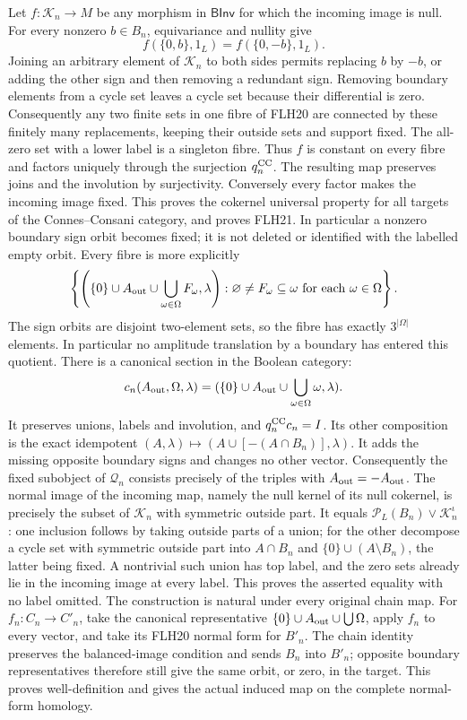 Let \(f:\mathcal K_n\to M\) be any morphism in
\(\mathsf{BInv}\) for which the incoming image is null.
For every nonzero \(b\in B_n\), equivariance and nullity give
\[
f(\{0,b\},1_L)=f(\{0,-b\},1_L).
\tag{FLH22}
\]
Joining an arbitrary element of \(\mathcal K_n\) to both
sides permits replacing \(b\) by \(-b\), or adding the other
sign and then removing a redundant sign. Removing boundary
elements from a cycle set leaves a cycle set because their
differential is zero. Consequently any two finite sets in
one fibre of FLH20 are connected by these finitely many
replacements, keeping their outside sets and support fixed.
The all-zero set with a lower label is a singleton fibre.
Thus \(f\) is constant on every fibre and factors uniquely
through the surjection \(q_n^{\rm CC}\). The resulting map
preserves joins and the involution by surjectivity.
Conversely every factor makes the incoming image fixed.
This proves the cokernel universal property for all targets
of the Connes--Consani category, and proves FLH21.
In particular a nonzero boundary sign orbit becomes fixed;
it is not deleted or identified with the labelled empty orbit.
Every fibre is more explicitly
\[
\left\{\left(\{0\}\cup A_{\rm out}
                   \cup\bigcup_{\omega\in\Omega}F_\omega,\lambda\right):
             \varnothing\ne F_\omega\subseteq\omega
                             \text{ for each }\omega\in\Omega\right\}.
\]
The sign orbits are disjoint two-element sets, so the fibre has
exactly \(3^{|\Omega|}\) elements. In particular no amplitude
translation by a boundary has entered this quotient.
There is a canonical section in the Boolean category:
\[
c_n(A_{\rm out},\Omega,\lambda)
 =(\{0\}\cup A_{\rm out}\cup\bigcup_{\omega\in\Omega}\omega,\lambda).
\]
It preserves unions, labels and involution, and
\(q_n^{\rm CC}c_n=I\).
Its other composition is the exact idempotent
\((A,\lambda)\mapsto(A\cup[-(A\cap B_n)],\lambda)\).
It adds the missing opposite boundary signs and changes
no other vector.
Consequently the fixed subobject of \(\mathcal Q_n\) consists
precisely of the triples with \(A_{\rm out}=-A_{\rm out}\).
The normal image of the incoming map, namely the null kernel
of its null cokernel, is precisely the subset of
\(\mathcal K_n\) with symmetric outside part. It equals
\(\mathcal P_L(B_n)\vee\mathcal K_n^\iota\):
one inclusion follows by taking outside parts of a union;
for the other decompose a cycle set with symmetric outside
part into \(A\cap B_n\) and \(\{0\}\cup(A\setminus B_n)\),
the latter being fixed. A nontrivial such union has top
label, and the zero sets already lie in the incoming image
at every label. This proves the asserted equality with
no label omitted.
The construction is natural under every original chain map.
For \(f_n:C_n\to C'_n\), take the canonical representative
\(\{0\}\cup A_{\rm out}\cup\bigcup\Omega\), apply \(f_n\)
to every vector, and take its FLH20 normal form for \(B'_n\).
The chain identity preserves the balanced-image condition
and sends \(B_n\) into \(B'_n\); opposite boundary representatives
therefore still give the same orbit, or zero, in the target.
This proves well-definition and gives the actual induced
map on the complete normal-form homology.

